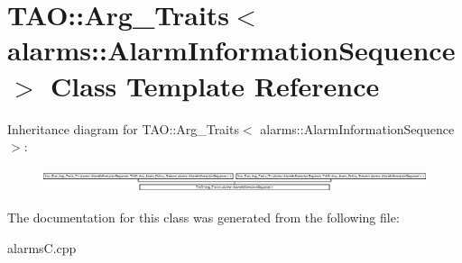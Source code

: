 \section{T\+AO\+:\+:Arg\+\_\+\+Traits$<$ alarms\+:\+:Alarm\+Information\+Sequence $>$ Class Template Reference}
\label{classTAO_1_1Arg__Traits_3_01alarms_1_1AlarmInformationSequence_01_4}
Inheritance diagram for T\+AO\+:\+:Arg\+\_\+\+Traits$<$ alarms\+:\+:Alarm\+Information\+Sequence $>$\+:\begin{figure}[H]
\begin{center}
\leavevmode
\includegraphics[height=0.719794cm]{classTAO_1_1Arg__Traits_3_01alarms_1_1AlarmInformationSequence_01_4}
\end{center}
\end{figure}


The documentation for this class was generated from the following file\+:\begin{DoxyCompactItemize}
\item 
alarms\+C.\+cpp\end{DoxyCompactItemize}
